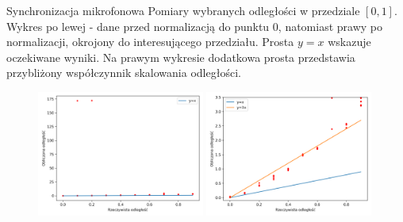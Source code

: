 \begin{frame}
    \begin{block}{Synchronizacja mikrofonowa}
        Pomiary wybranych odległości w przedziale $[0,1]$. Wykres po lewej - dane przed normalizacją do punktu $0$, natomiast prawy po normalizacji, okrojony do interesującego przedziału. Prosta $y=x$ wskazuje oczekiwane wyniki. Na prawym wykresie dodatkowa prosta przedstawia przybliżony współczynnik skalowania odległości.
    \end{block}
    \begin{figure}
        \centering
        \includegraphics[width=0.49\textwidth]{../pics/mic_sync_dist/dists.png}
        \includegraphics[width=0.49\textwidth]{../pics/mic_sync_dist/dists_close.png}
    \end{figure}
\end{frame}